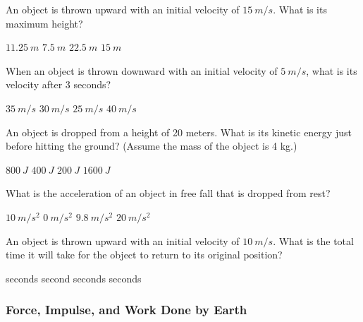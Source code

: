 \documentclass[../main-physics-problems.tex]{subfiles}
\begin{document}
\begin{questions}
\question  
An object is thrown upward with an initial velocity of \(\SI{15}{m/s}\). What is its maximum height?  

\begin{randomizechoices}  
    \correctchoice \(\SI{11.25}{m}\)  
    \choice \(\SI{7.5}{m}\)  
    \choice \(\SI{22.5}{m}\)  
    \choice \(\SI{15}{m}\)  
\end{randomizechoices}  


\question  
When an object is thrown downward with an initial velocity of \(\SI{5}{m/s}\), what is its velocity after 3 seconds?  

\begin{randomizechoices}  
    \correctchoice \(\SI{35}{m/s}\)  
    \choice \(\SI{30}{m/s}\)  
    \choice \(\SI{25}{m/s}\)  
    \choice \(\SI{40}{m/s}\)  
\end{randomizechoices}  


\question  
An object is dropped from a height of 20 meters. What is its kinetic energy just before hitting the ground? (Assume the mass of the object is 4 kg.)  

\begin{randomizechoices}  
    \correctchoice \(\SI{800}{J}\)  
    \choice \(\SI{400}{J}\)  
    \choice \(\SI{200}{J}\)  
    \choice \(\SI{1600}{J}\)  
\end{randomizechoices}  


\question  
What is the acceleration of an object in free fall that is dropped from rest?  

\begin{randomizechoices}  
    \correctchoice \(\SI{10}{m/s^2}\)  
    \choice \(\SI{0}{m/s^2}\)  
    \choice \(\SI{9.8}{m/s^2}\)  
    \choice \(\SI{20}{m/s^2}\)  
\end{randomizechoices}  


\question  
An object is thrown upward with an initial velocity of \(\SI{10}{m/s}\). What is the total time it will take for the object to return to its original position?  

\begin{randomizechoices}  
     seconds  
     second  
     seconds  
     seconds  
\end{randomizechoices}  
\end{questions}

\clearpage

\subsubsection{Force, Impulse, and Work Done by Earth}
\end{document}
